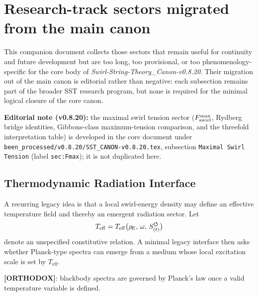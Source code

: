 \makeatletter
{}
\makeatother


\section{Research-track sectors migrated from the main canon}

\noindent
This companion document collects those sectors that remain useful for continuity and future development but are too long, too provisional, or too phenomenology-specific for the core body of \textit{Swirl-String-Theory\_Canon-v0.8.20}. Their migration out of the main canon is editorial rather than negative: each subsection remains part of the broader SST research program, but none is required for the minimal logical closure of the core canon.

\medskip
\noindent
\textbf{Editorial note (v0.8.20):} the maximal swirl tension sector ($F_{\rm swirl}^{\max}$, Rydberg bridge identities, Gibbons-class maximum-tension comparison, and the threefold interpretation table) is developed in the core document under \verb|been_processed/v0.8.20/SST_CANON-v0.8.20.tex|, subsection \texttt{Maximal Swirl Tension} (label \texttt{sec:Fmax}); it is not duplicated here.

\medskip








\subsection{Thermodynamic Radiation Interface}
A recurring legacy idea is that a local swirl-energy density may define an effective temperature field and thereby an emergent radiation sector. Let
\begin{align}
    T_{\mathrm{eff}} = T_{\mathrm{eff}}\big(\rho_{\!E},\, \omega,\, S_{(t)}^{\boldsymbol{\circlearrowleft}}\big)
\end{align}
denote an unspecified constitutive relation. A minimal legacy interface then asks whether Planck-type spectra can emerge from a medium whose local excitation scale is set by $T_{\mathrm{eff}}$.

\textbf{[ORTHODOX]}: blackbody spectra are governed by Planck's law once a valid temperature variable is defined.

